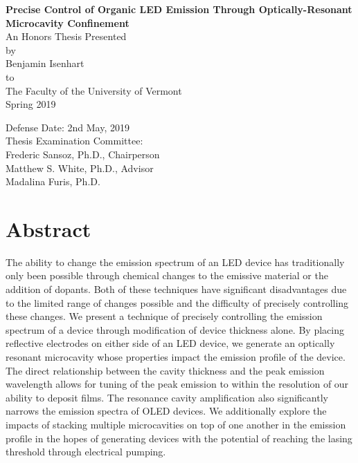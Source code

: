 \documentclass{report}
\author{Benjamin Isenhart}
\begin{document}
\begin{titlepage}
	\begin{center}
		\vspace{1cm}
		\Huge
		\textbf{Precise Control of Organic LED Emission Through Optically-Resonant Microcavity Confinement}\\
		\vspace{1.5cm}
		\Large
		An Honors Thesis Presented\\
		by\\
		Benjamin Isenhart\\
		to\\
		The Faculty of the University of Vermont\\
		\vspace{0.5cm}
		Spring 2019
		\vspace{2cm}
	\end{center}
	\begin{flushright}
		\Large
		Defense Date: 2nd May, 2019\\
		Thesis Examination Committee:\\
		\vspace{0.5cm}
		Frederic Sansoz, Ph.D., Chairperson\\
		Matthew S. White, Ph.D., Advisor\\
		Madalina Furis, Ph.D.\\
	\end{flushright}
\end{titlepage}

\chapter*{Abstract} \label{abstract}
The ability to change the emission spectrum of an LED device has traditionally only been possible through chemical changes to the emissive material or the addition of dopants. Both of these techniques have significant disadvantages due to the limited range of changes possible and the difficulty of precisely controlling these changes. We present a technique of precisely controlling the emission spectrum of a device through modification of device thickness alone. By placing reflective electrodes on either side of an LED device, we generate an optically resonant microcavity whose properties impact the emission profile of the device. The direct relationship between the cavity thickness and the peak emission wavelength allows for tuning of the peak emission to within the resolution of our ability to deposit films. The resonance cavity amplification also significantly narrows the emission spectra of OLED devices. We additionally explore the impacts of stacking multiple microcavities on top of one another in the emission profile in the hopes of generating devices with the potential of reaching the lasing threshold through electrical pumping.
\end{document}

